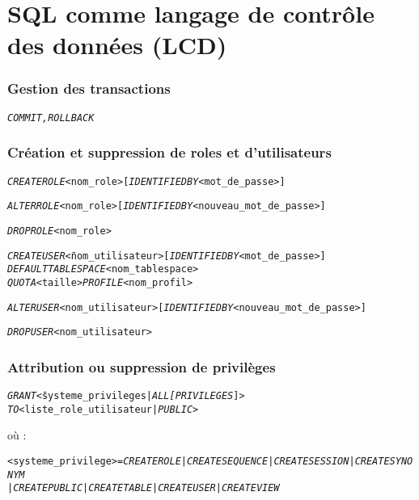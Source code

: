 \documentclass[10pt]{article}
\begin{document}
\part{SQL comme langage de contrôle des données (LCD)}
	\section{Gestion des transactions}
		\begin{alltt}
			\emph{COMMIT, ROLLBACK}
		\end{alltt}
		
	\section{Création et suppression de roles et d'utilisateurs}
		\begin{alltt}
			\emph{CREATE ROLE} <nom_role> [\emph{IDENTIFIED BY} <mot_de_passe>]
			
			\emph{ALTER ROLE} <nom_role> [\emph{IDENTIFIED BY} <nouveau_mot_de_passe>]
			
			\emph{DROP ROLE} <nom_role>
			\begin{tabbing}
				\emph{CREATE USER} \= <nom_utilisateur> [\emph{IDENTIFIED BY} <mot_de_passe>]\\
				\emph{DEFAULT TABLESPACE} <nom_tablespace>\\
				\emph{QUOTA} \> <taille> \emph{PROFILE} <nom_profil>
			\end{tabbing}
			\emph{ALTER USER} <nom_utilisateur> [\emph{IDENTIFIED BY} <nouveau_mot_de_passe>]
			
			\emph{DROP USER} <nom_utilisateur>
		\end{alltt}
		
	\section{Attribution ou suppression de privilèges}
		\begin{alltt}
			\begin{tabbing}
				\emph{GRANT} \= <systeme_privileges | \emph{ALL} \emph{[PRIVILEGES}]>\\
				\emph{TO} \> <liste_role_utilisateur | \emph{PUBLIC}>\\
				[\emph{WITH ADMIN OPTION}]
			\end{tabbing}
		\end{alltt}
		
		où :
		\begin{alltt}
			\begin{tabbing}
				<systeme_privilege> = \= \emph{CREATE ROLE} | \emph{CREATE SEQUENCE} | \emph{CREATE SESSION} | \emph{CREATE SYNONYM}\\
				\>  | \emph{CREATE PUBLIC} | \emph{CREATE TABLE} | \emph{CREATE USER} | \emph{CREATE VIEW}
			\end{tabbing}
		\end{alltt}
		
\end{document}
